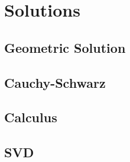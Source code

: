 % 

\section{Solutions}

\subsection{Geometric Solution}

\subsection{Cauchy-Schwarz}

\subsection{Calculus}

\subsection{SVD}

\endinput  %
